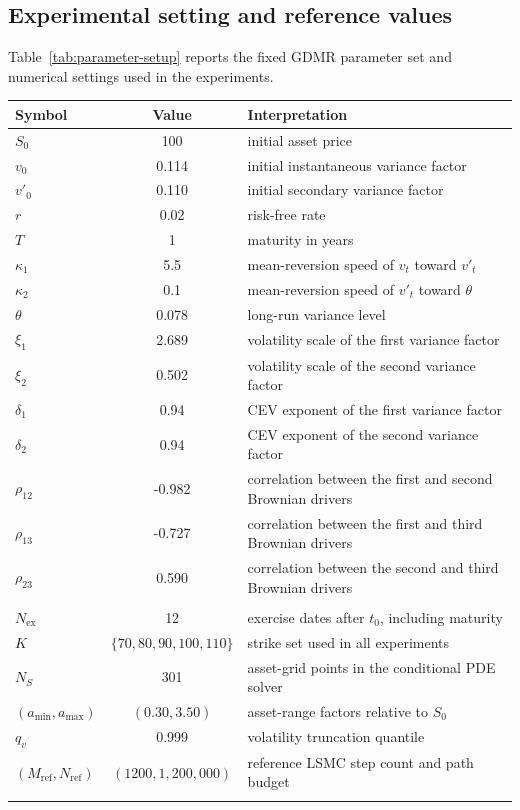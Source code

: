 \documentclass[pdflatex,sn-mathphys-num]{sn-jnl}
\makeatletter
\theoremstyle{thmstyleone}%
\theoremstyle{thmstylethree}%
\theoremstyle{thmstyletwo}%
\renewenvironment{table}[1][]{%
  \par\addvspace{12pt}%
  \noindent\begin{minipage}{\textwidth}%
  \def\@captype{table}%
  \centering%
  \tablebodyfont%
}{%
  \end{minipage}%
  \par\addvspace{12pt}%
}
\makeatother
\begin{document}
\subsection{Experimental setting and reference values}

Table~\ref{tab:parameter-setup} reports the fixed GDMR parameter set and
numerical settings used in the experiments.
\begin{table}[htbp]
\centering
\caption{Parameter set and numerical settings used in the Bermudan pricing experiments.}
\label{tab:parameter-setup}
\begin{threeparttable}
\small
\begin{tabularx}{0.94\textwidth}{@{}l c X@{}}
\toprule
Symbol & Value & Interpretation \\
\midrule
$S_0$ & 100 & initial asset price \\
$v_0$ & 0.114 & initial instantaneous variance factor \\
$v'_0$ & 0.110 & initial secondary variance factor \\
$r$ & 0.02 & risk-free rate \\
$T$ & 1 & maturity in years \\
$\kappa_1$ & 5.5 & mean-reversion speed of $v_t$ toward $v'_t$ \\
$\kappa_2$ & 0.1 & mean-reversion speed of $v'_t$ toward $\theta$ \\
$\theta$ & 0.078 & long-run variance level \\
$\xi_1$ & 2.689 & volatility scale of the first variance factor \\
$\xi_2$ & 0.502 & volatility scale of the second variance factor \\
$\delta_1$ & 0.94 & CEV exponent of the first variance factor \\
$\delta_2$ & 0.94 & CEV exponent of the second variance factor \\
$\rho_{12}$ & -0.982 & correlation between the first and second Brownian drivers \\
$\rho_{13}$ & -0.727 & correlation between the first and third Brownian drivers \\
$\rho_{23}$ & 0.590 & correlation between the second and third Brownian drivers \\
\addlinespace
\multicolumn{3}{@{}l}{\textit{Fixed numerical setting}} \\
$N_{\mathrm{ex}}$ & 12 & exercise dates after $t_0$, including maturity \\
$K$ & $\{70,80,90,100,110\}$ & strike set used in all experiments \\
$N_S$ & 301 & asset-grid points in the conditional PDE solver \\
$(a_{\min},a_{\max})$ & $(0.30,3.50)$ & asset-range factors relative to $S_0$ \\
$q_v$ & 0.999 & volatility truncation quantile \\
$(M_{\mathrm{ref}},N_{\mathrm{ref}})$ & $(1200,1{,}200{,}000)$ & reference LSMC step count and path budget \\
\botrule
\end{tabularx}
\end{threeparttable}
\end{table}
\end{document}
